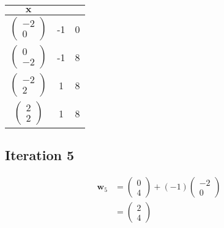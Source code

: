 \documentclass[11pt, a4paper]{article}
\begin{document}
\begin{table}[htbp]
	\centering
	\begin{tabular}{|c|c|c|}
		\toprule
		$\boldsymbol{x}$    \\
		\midrule
		$\begin{pmatrix} -2 \\ 0 \end{pmatrix}$ & -1 & 0 \\
		$\begin{pmatrix} 0  \\ -2 \end{pmatrix}$ & -1 & 8 \\
		$\begin{pmatrix} -2 \\ 2 \end{pmatrix}$ & 1 & 8 \\
		$\begin{pmatrix} 2  \\ 2 \end{pmatrix}$ & 1 & 8 \\
		\hline
	\end{tabular}
\end{table}

\FloatBarrier

\subsection{Iteration 5}

\begin{align*}
	\boldsymbol{w}_5 & = \begin{pmatrix} 0 \\ 4 \end{pmatrix} + (-1)  \begin{pmatrix} -2 \\ 0 \end{pmatrix}  \\
	                 & = \begin{pmatrix} 2 \\ 4 \end{pmatrix}
\end{align*}
\end{document}
